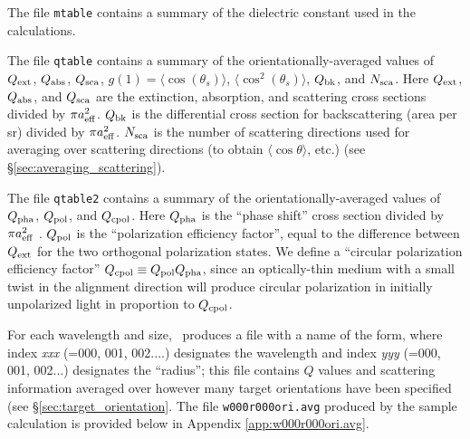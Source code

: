 The file {\tt mtable} contains a summary of the dielectric constant
used in the calculations.

The file {\tt qtable} contains a summary of the
orientationally-averaged values of $Q_{\rm ext}$, $Q_{\rm abs}$, $Q_{\rm sca}$,
$g(1)=\langle\cos(\theta_s)\rangle$,
$\langle\cos^2(\theta_s)\rangle$, $Q_{\rm bk}$, and $N_{\rm sca}$.  
Here $Q_{\rm ext}$,
$Q_{\rm abs}$, and $Q_{\rm sca}$ are the extinction, absorption, and
scattering cross sections divided by $\pi a_{\rm eff}^2$.  $Q_{\rm bk}$ is
the differential cross section for backscattering (area per sr)
divided by $\pi a_{\rm eff}^2$.
$N_{\rm sca}$ is the number of scattering directions used for averaging
over scattering directions (to obtain $\langle\cos\theta\rangle$, etc.)
(see \S\ref{sec:averaging_scattering}).

The file {\tt qtable2} contains a summary of the
orientationally-averaged values of $Q_{\rm pha}$, $Q_{\rm pol}$, and
$Q_{\rm cpol}$.  
Here $Q_{\rm pha}$ is the ``phase shift'' cross section
divided by $\pi a_{\rm eff}^2$ \citep[see definition in]{Draine_1988}.
$Q_{\rm pol}$ is the ``polarization efficiency factor'', equal to the
difference between $Q_{\rm ext}$ for the two orthogonal polarization
states.  We define a ``circular polarization efficiency factor''
$Q_{\rm cpol}\equiv Q_{\rm pol}Q_{\rm pha}$, 
since an optically-thin medium with a
small twist in the alignment direction will produce circular
polarization in initially unpolarized light in proportion to
$Q_{\rm cpol}$.

For each wavelength and size, \ddscatv\ produces a file with a
name of the form, where index
{\it xxx} (=000, 001, 002....)  designates the wavelength and index {\it
yyy} (=000, 001, 002...) designates the ``radius''; this file contains $Q$
values and scattering information averaged over however many target
orientations have been specified (see \S\ref{sec:target_orientation}.
The file {\tt w000r000ori.avg} produced by the sample calculation is
provided below in Appendix \ref{app:w000r000ori.avg}.

